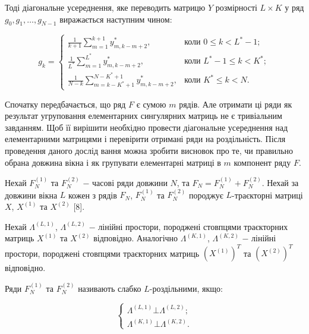 Тоді діагональне усереднення, яке переводить матрицю $Y$ розмірності $L \times K$ у ряд $g_{0}, g_{1}, \dots, g_{N-1}$ виражається наступним чином:

\begin{equation}
g_{k} = \begin{cases}
\frac{1}{k+1}\sum_{m=1}^{k+1}y_{m,k-m+2}^{*}, &\text{коли } 0 \le k < L^{*} - 1; \\
\frac{1}{L^{*}}\sum_{m=1}^{L^{*}}y_{m,k-m+2}^{*}, &\text{коли } L^{*} - 1 \le k < K^{*}; \\
\frac{1}{N-k}\sum_{m=k-K^{*}+1}^{N-K^{*}+1}y_{m,k-m+2}^{*}, &\text{коли } K^{*} \le k < N.
\end{cases}
\end{equation}

\vspace{1.5em}


Спочатку передбачається, що ряд $F$ є сумою $m$ рядів. Але отримати ці ряди як результат угруповання елементарних сингулярних матриць не є тривіальним завданням. Щоб її вирішити необхідно провести діагональне усереднення над елементарними матрицями і перевірити отримані ряди на роздільність. Після проведення даного дослід вання можна зробити висновок про те, чи правильно обрана довжина вікна і як групувати елементарні матриці в $m$ компонент ряду $F$.


Нехай $F_{N}^{(1)}$ та $F_{N}^{(2)}$ $-$ часові ряди довжини $N$, та $F_{N} = F_{N}^{(1)} + F_{N}^{(2)}$. Нехай за довжини вікна $L$ кожен з рядів $F_{N}$, $F_{N}^{(1)}$ та $F_{N}^{(2)}$ породжує $L$-траєкторні матриці $X$, $X^{(1)}$ та $X^{(2)}$ [8].

Нехай $\Lambda^{(L,1)}$, $\Lambda^{(L,2)}$ $-$ лінійні простори, породжені стовпцями траєкторних матриць $X^{(1)}$ та $X^{(2)}$ відповідно. Аналогічно $\Lambda^{(K,1)}$, $\Lambda^{(K,2)}$ $-$ лінійні простори, породжені стовпцями траєкторних матриць $(X^{(1)})^{T}$ та $(X^{(2)})^{T}$ відповідно.

Ряди $F_{N}^{(1)}$ та $F_{N}^{(2)}$ називають слабко $L$-роздільними, якщо:

\begin{equation}
	\left\{
	\begin{aligned}
	\Lambda^{(L,1)} \bot \Lambda^{(L,2)}; \\
	\Lambda^{(K,1)} \bot \Lambda^{(K,2)}.
	\end{aligned}
	\right.
\end{equation}

\vspace{1.5em}

